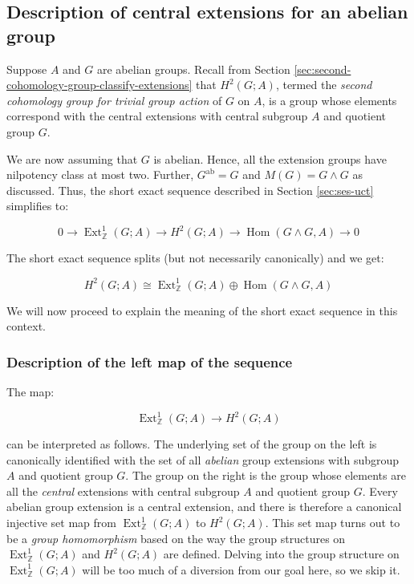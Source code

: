 \subsection{Description of central extensions for an abelian group}\label{sec:ses-uct-abelian}

Suppose $A$ and $G$ are abelian groups. Recall from Section
\ref{sec:second-cohomology-group-classify-extensions} that $H^2(G;A)$,
termed the {\em second cohomology group for trivial group action} of
$G$ on $A$, is a group whose elements correspond with the central
extensions with central subgroup $A$ and quotient group $G$.

We are now assuming that $G$ is abelian. Hence, all the extension
groups have nilpotency class at most two. Further,
$G^{\operatorname{ab}} = G$ and $M(G) = G \wedge G$ as
discussed. Thus, the short exact sequence described in
Section \ref{sec:ses-uct} simplifies to:

\begin{equation}\label{eq:ses-uct-abelian}
  0 \to \operatorname{Ext}^1_{\mathbb{Z}}(G;A) \to H^2(G;A) \to \operatorname{Hom}(G \wedge G,A) \to 0
\end{equation}

The short exact sequence splits (but not necessarily canonically) and we get:

$$H^2(G;A) \cong \operatorname{Ext}^1_{\mathbb{Z}}(G;A) \oplus \operatorname{Hom}(G \wedge G,A)$$

We will now proceed to explain the meaning of the short exact sequence
in this context.

\subsubsection{Description of the left map of the sequence}\label{sec:ses-uct-abelian-left-map}

The map:

$$\operatorname{Ext}^1_{\mathbb{Z}}(G;A) \to H^2(G;A)$$

can be interpreted as follows. The underlying set of the group on the
left is canonically identified with the set of all {\em abelian} group
extensions with subgroup $A$ and quotient group $G$. The group on the
right is the group whose elements are all the {\em central} extensions
with central subgroup $A$ and quotient group $G$. Every abelian group
extension is a central extension, and there is therefore a canonical
injective set map from $\operatorname{Ext}^1_{\mathbb{Z}}(G;A)$ to
$H^2(G;A)$. This set map turns out to be a {\em group homomorphism}
based on the way the group structures on
$\operatorname{Ext}^1_{\mathbb{Z}}(G;A)$ and $H^2(G;A)$ are
defined. Delving into the group structure on
$\operatorname{Ext}^1_{\mathbb{Z}}(G;A)$ will be too much of a
diversion from our goal here, so we skip it.


